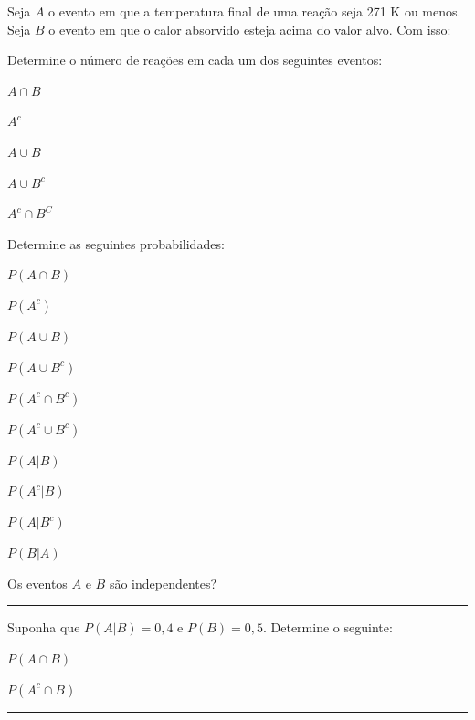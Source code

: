 \documentclass[a4paper,11pt,fleqn]{article}\usepackage[]{graphicx}\usepackage[]{color}
\theoremstyle{definition}
\begin{document}
\begin{compactenum}
  Seja $A$ o evento em que a temperatura final de uma reação seja 271 K
  ou menos. Seja $B$ o evento em que o calor absorvido esteja acima do
  valor alvo. Com isso:
  \begin{compactenum}
  \item Determine o número de reações em cada um dos seguintes eventos: \\
    \begin{inparaenum}
    \item $A \cap B$ \,
    \item $A^c$ \,
    \item $A \cup B$ \,
    \item $A \cup B^c$ \,
    \item $A^c \cap B^C$
    \end{inparaenum}
  \item Determine as  seguintes probabilidades: \\
    \begin{inparaenum}
    \item $P(A \cap B)$ \,
    \item $P(A^c)$ \,
    \item $P(A \cup B)$ \,
    \item $P(A \cup B^c)$ \,
    \item $P(A^c \cap B^c)$ \,
    \item $P(A^c \cup B^c)$ \,
    \item $P(A|B)$ \,
    \item $P(A^c|B)$ \,
    \item $P(A|B^c)$ \,
    \item $P(B|A)$
    \end{inparaenum}
  \item Os eventos $A$ e $B$ são independentes?
  \end{compactenum}

\vspace{0.3cm}
\hrule
\vspace{0.3cm}

\item Suponha que $P(A|B) = 0,4$ e $P(B) = 0,5$. Determine o seguinte: \\
  \begin{inparaenum}
  \item $P(A \cap B)$ \,
  \item $P(A^c \cap B)$
  \end{inparaenum}

\vspace{0.3cm}
\hrule
\vspace{0.3cm}


\end{compactenum}
\end{document}
